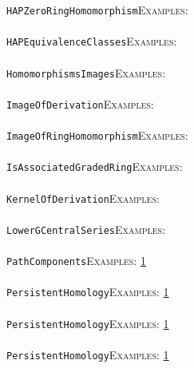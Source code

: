 \documentclass[a4paper,11pt]{report}
\begin{document}
{{ \texttt{HAPZeroRingHomomorphism}{\nobreakspace}{\nobreakspace}{\nobreakspace}{\nobreakspace}\textsc{Examples:} \\
 \\
 \texttt{HAP{\textunderscore}EquivalenceClasses}{\nobreakspace}{\nobreakspace}{\nobreakspace}{\nobreakspace}\textsc{Examples:} \\
 \\
 \texttt{HomomorphismsImages}{\nobreakspace}{\nobreakspace}{\nobreakspace}{\nobreakspace}\textsc{Examples:} \\
 \\
 \texttt{ImageOfDerivation}{\nobreakspace}{\nobreakspace}{\nobreakspace}{\nobreakspace}\textsc{Examples:} \\
 \\
 \texttt{ImageOfRingHomomorphism}{\nobreakspace}{\nobreakspace}{\nobreakspace}{\nobreakspace}\textsc{Examples:} \\
 \\
 \texttt{IsAssociatedGradedRing}{\nobreakspace}{\nobreakspace}{\nobreakspace}{\nobreakspace}\textsc{Examples:} \\
 \\
 \texttt{KernelOfDerivation}{\nobreakspace}{\nobreakspace}{\nobreakspace}{\nobreakspace}\textsc{Examples:} \\
 \\
 \texttt{LowerGCentralSeries}{\nobreakspace}{\nobreakspace}{\nobreakspace}{\nobreakspace}\textsc{Examples:} \\
 \\
 \texttt{PathComponents}{\nobreakspace}{\nobreakspace}{\nobreakspace}{\nobreakspace}\textsc{Examples:} \href{../www/SideLinks/About/aboutQuandles.html} {1}{\nobreakspace} \\
 \\
 \texttt{PersistentHomology}{\nobreakspace}{\nobreakspace}{\nobreakspace}{\nobreakspace}\textsc{Examples:} \href{../www/SideLinks/About/aboutPersistent.html} {1}{\nobreakspace} \\
 \\
 \texttt{PersistentHomology}{\nobreakspace}{\nobreakspace}{\nobreakspace}{\nobreakspace}\textsc{Examples:} \href{../www/SideLinks/About/aboutPersistent.html} {1}{\nobreakspace} \\
 \\
 \texttt{PersistentHomology}{\nobreakspace}{\nobreakspace}{\nobreakspace}{\nobreakspace}\textsc{Examples:} \href{../www/SideLinks/About/aboutPersistent.html} {1}{\nobreakspace} \\
 \\
}}
\end{document}
